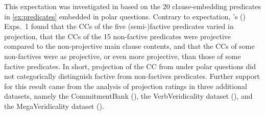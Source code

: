 \documentclass[a4paper,12pt,twoside]{article}
\newcommand{\posscite}[1]{\citeauthor{#1}'s (\citeyear{#1})}
\begin{document}
        This expectation was investigated in \citealt{degen_are_2022} based on the 20 clause-em\-bed\-ding predicates in \ref{ex:predicates} embedded in polar questions. Contrary to expectation, \posscite{degen_are_2022} Exps.~1 found that the CCs of the five (semi-)factive predicates varied in projection, that the CCs of the 15 non-factive predicates were projective compared to the non-projective main clause contents, and that the CCs of some non-factives were as projective, or even more projective, than those of some factive predicates.  In short, projection of the CC from under polar questions did not categorically distinguish factive from non-factives predicates. Further support for this result came from the analysis of projection ratings in three additional datasets, namely the CommitmentBank (\citealt{de_marneffe_commitmentbank_2019}), the VerbVeridicality dataset (\citealt{ross_how_2019}), and the MegaVeridicality  dataset (\citealt{white_role_2018}).
        
\end{document}
